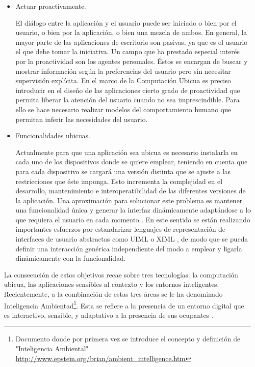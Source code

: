 {\begin{itemize}
\item Actuar proactivamente. 

El diálogo entre la aplicación y el usuario puede
ser iniciado o bien por el usuario, o bien por la aplicación, o bien una
mezcla de ambos. En general, la mayor parte de las aplicaciones de escritorio
son pasivas, ya que es el usuario el que debe tomar la iniciativa. Un
campo que ha prestado especial interés por la proactividad son los agentes
personales. Éstos se encargan de buscar y mostrar información según la
preferencias del usuario pero sin necesitar supervisión explícita. En el marco
de la Computación Ubicua es preciso introducir en el diseño de las aplicaciones
cierto grado de proactividad que permita liberar la atención del usuario
cuando no sea imprescindible. Para ello se hace necesario realizar modelos
del comportamiento humano \cite{cap1.198} que permitan inferir las
necesidades del usuario.

\item Funcionalidades ubicuas. 

Actualmente para que una aplicación sea ubicua
es necesario instalarla en cada uno de los dispositivos donde se quiere emplear,
teniendo en cuenta que para cada dispositivo se cargará una versión distinta que
se ajuste a las restricciones que éste imponga. Esto incrementa la complejidad
en el desarrollo, mantenimiento e interoperatibilidad de las diferentes
versiones de la aplicación. Una aproximación para solucionar este problema es
mantener una funcionalidad única y generar la interfaz dinámicamente adaptándose
a lo que requiera el usuario en cada momento \cite{cap1.205}. En este
sentido se están realizando importantes esfuerzos por estandarizar lenguajes de
representación de interfaces de usuario abstractas como UIML \cite{cap1.16} o
XIML \cite{cap1.214}, de modo que se pueda definir una interacción genérica
independiente del modo a emplear y ligarla dinámicamente con la funcionalidad.
\end{itemize}

La consecución de estos objetivos recae sobre tres tecnologías: la computación
ubicua, las aplicaciones sensibles al contexto y los entornos inteligentes.
Recientemente, a la combinación de estas tres áreas se le ha denominado
Inteligencia 
Ambientad\footnote{
Documento donde por primera vez se introduce el concepto y definición de
"Inteligencia
Ambiental"  \url{http://www.epstein.org/brian/ambient_intelligence.htm}}. Esta
se refiere a la presencia de un entorno digital
que es interactivo, sensible, y adaptativo a la presencia de sus ocupantes
\cite{cap1.16}.

}

